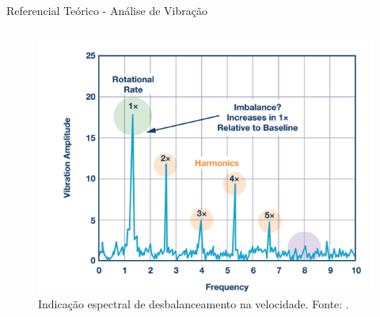 \documentclass[aspectratio=169]{beamer}
\begin{document}
\begin{frame}{Referencial Teórico - Análise de Vibração}
\begin{columns}
		\begin{column}{0.5\textwidth}
			\begin{figure}[HT]
				\begin{center}
					\includegraphics[scale=.31]{../referencial/img/imbalance_analog_p2.png}
					\caption{Indicação espectral de desbalanceamento na velocidade. \newline
					Fonte: .} 
					\label{fig:imbalance_analog_p2}
				\end{center}
			\end{figure}
	 	\end{column}
	 \end{columns}
\end{frame}

\end{document}
